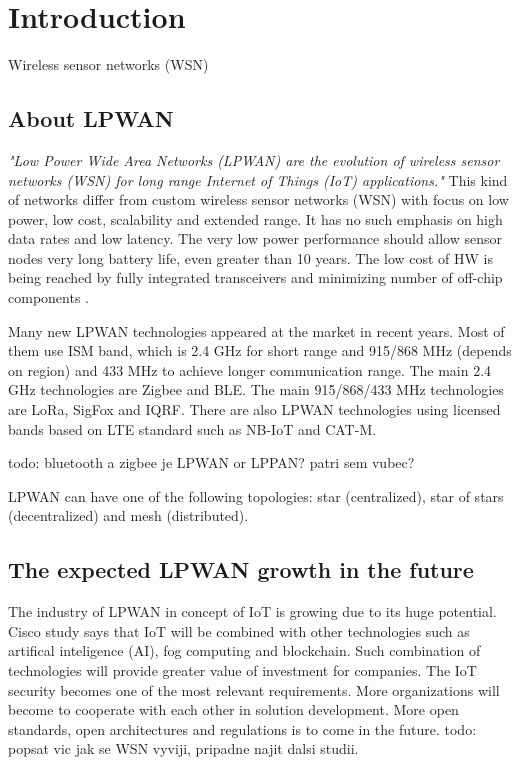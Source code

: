\chapter{Introduction}

Wireless sensor networks (WSN) 



\section{About LPWAN}
\textit{"Low Power Wide Area Networks (LPWAN) are the
evolution of wireless sensor networks (WSN) for long
range Internet of Things (IoT) applications."} \cite{MURS Band for LPWAN Applications}
This kind of networks differ from custom wireless sensor networks (WSN) with focus on low power, low cost, scalability and extended range.
It has no such emphasis on high data rates and low latency.
The very low power performance should allow sensor nodes very long battery life, even greater than 10 years.
The low cost of HW is being reached by fully integrated transceivers and minimizing number of off-chip components \cite{MURS Band for LPWAN Applications}.


Many new LPWAN technologies appeared at the market in recent years.
Most of them use ISM band, which is 2.4 GHz for short range and 915/868 MHz (depends on region) and 433 MHz to achieve longer communication range.
The main 2.4 GHz technologies are Zigbee and BLE.
The main 915/868/433 MHz technologies are LoRa, SigFox and IQRF.
There are also LPWAN technologies using licensed bands based on LTE standard
such as NB-IoT and CAT-M.

todo: bluetooth a zigbee je LPWAN or LPPAN? patri sem vubec?




LPWAN can have one of the following topologies: star (centralized), star of stars (decentralized) and mesh (distributed).
\cite{high density LPWAN}










\section{The expected LPWAN growth in the future}
The industry of LPWAN in concept of IoT is growing due to its huge potential.
Cisco study \cite{IoT cisco study} says that IoT will be combined with other technologies such as artifical inteligence (AI), fog computing and blockchain. Such combination of technologies will provide greater value of investment for companies. 
The IoT security becomes one of the most relevant requirements.
More organizations will become to cooperate with each other in solution development.
More open standards, open architectures and regulations is to come in the future.
todo: popsat vic jak se WSN vyviji, pripadne najit dalsi studii.





